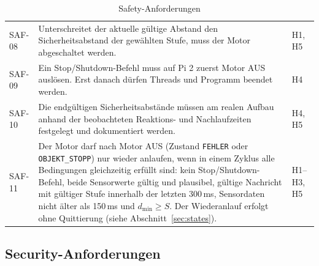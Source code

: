 \begin{table}[H]
\begin{tabularx}{\textwidth}{@{}p{1.5cm}Yp{2.0cm}@{}}
        SAF-08 & Unterschreitet der aktuelle gültige Abstand den Sicherheitsabstand der gewählten Stufe, muss der Motor abgeschaltet werden. & H1, H5 \\
        SAF-09 & Ein Stop/Shutdown-Befehl muss auf Pi 2 zuerst Motor AUS auslösen. Erst danach dürfen Threads und Programm beendet werden. & H4 \\
        SAF-10 & Die endgültigen Sicherheitsabstände müssen am realen Aufbau anhand der beobachteten Reaktions- und Nachlaufzeiten festgelegt und dokumentiert werden. & H4, H5 \\
        SAF-11 & Der Motor darf nach Motor AUS (Zustand \texttt{FEHLER} oder \texttt{OBJEKT\_STOPP}) nur wieder anlaufen, wenn in einem Zyklus alle Bedingungen gleichzeitig erfüllt sind: kein Stop/Shutdown-Befehl, beide Sensorwerte gültig und plausibel, gültige Nachricht mit gültiger Stufe innerhalb der letzten 300\,ms, Sensordaten nicht älter als 150\,ms und $d_{\min} \geq S$. Der Wiederanlauf erfolgt ohne Quittierung (siehe Abschnitt~\ref{sec:states}). & H1--H3, H5 \\
        \bottomrule
    \end{tabularx}
    \caption{Safety-Anforderungen}
\end{table}

\subsection{Security-Anforderungen}

